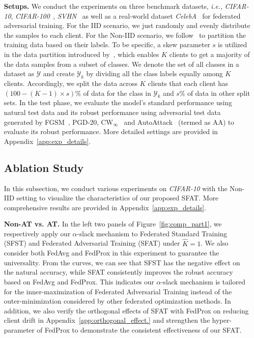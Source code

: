 \documentclass{article} %
\newcommand{\cY}{\mathcal{Y}}
\theoremstyle{plain}
\theoremstyle{definition}
\theoremstyle{remark}
\begin{document}
\textbf{Setups.}  We conduct the experiments on three benchmark datasets, \textit{i.e.,} \textit{CIFAR-10}, \textit{CIFAR-100}~\citep{krizhevsky2009learning_cifar10}, \textit{SVHN}~\citep{netzer2011reading_SVHN} as well as a real-world dataset \textit{CelebA}~\citep{caldas2018leaf} for federated adversarial training. For the IID scenario, we just randomly and evenly distribute the samples to each client. For the Non-IID scenario, we follow~\citet{mcmahan2017communication,shah2021adversarial} to 
partition the training data based on their labels. To be specific, a skew parameter $s$ is utilized in the data partition introduced by~\citet{shah2021adversarial}, which enables $K$ clients to get a majority of the data samples from a subset of classes. We denote the set of all classes in a dataset as $\cY$ and create $\cY_{k}$ by dividing all the class labels equally among $K$ clients. Accordingly, we split the data across $K$ clients that each client has $(100-(K-1)\times s)\%$ of data for the class in $\cY_k$ and $s\%$ of data in other split sets. In the test phase, we evaluate the model's standard performance using natural test data and its robust performance using adversarial test data generated by FGSM~\citep{Goodfellow14_Adversarial_examples}, PGD-20, CW$_\infty$~\citep{Carlini017_CW} and AutoAttack~\citep{croce2020reliable} (termed as AA) to evaluate its robust performance. More detailed settings are provided in Appendix~\ref{app:exp_details}.

\subsection{Ablation Study}
\label{sec:exp_comp}

In this subsection, we conduct various experiments on \textit{CIFAR-10} with the Non-IID setting to visualize the characteristics of our proposed SFAT. More comprehensive results are provided in Appendix~\ref{app:exp_details}.


\textbf{Non-AT vs. AT.} In the left two panels of Figure~\ref{fig:comp_part1}, we respectively apply our $\alpha$-slack mechanism to Federated Standard Training (SFST) and Federated Adversarial Training (SFAT) under $\widehat{K}=1$. We also consider both FedAvg and FedProx in this experiment to guarantee the universality. From the curves, we can see that SFST has the negative effect on the natural accuracy, while SFAT consistently improves the robust accuracy based on FedAvg and FedProx. This indicates our $\alpha$-slack mechanism is tailored for the inner-maximization of Federated Adversarial Training instead of the outer-minimization considered by other federated optimization methods. In addition, we also verify the orthogonal effects of SFAT with FedProx on reducing client drift in Appendix~\ref{app:orthogonal_effect.} and strengthen the hyper-parameter of FedProx to demonstrate the consistent effectiveness of our SFAT.
\end{document}
